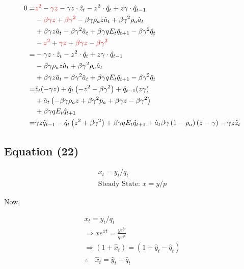 \documentclass[11pt,preprint, authoryear]{elsarticle}
\numberwithin{equation}{section}
\numberwithin{figure}{section}
\numberwithin{table}{section}
\begin{document}
\[\begin{aligned}
0 = & \begingroup\color{red}z^{2} \endgroup - \begingroup \color{red} {\gamma z} \endgroup - \gamma z \cdot \hat{z}_t - z^{2} \cdot \hat{q}_t 
+ z \gamma \cdot \hat{q}_{t-1}\\
& - \begingroup \color{red}{\beta \gamma z} \endgroup + \begingroup \color{red}{\beta \gamma^{2}} \endgroup - \beta \gamma \rho_{a} z \hat{a}_{t} + \beta \gamma^{2} \rho_{a} \hat{a}_{t}\\
& + \beta \gamma z \hat{a}_{t} - \beta \gamma^{2} \hat{a}_{t}
+\beta \gamma q E_{t} \hat{q}_{t+1}-\beta \gamma^{2} \hat{q}_{t} \\
& - \begingroup \color{red}{z^2} \endgroup + \begingroup \color{red}{\gamma z} \endgroup + \begingroup \color{red}{\beta \gamma z} \endgroup - \begingroup \color{red}{\beta \gamma^2} \endgroup \\
=& - \gamma z \cdot \hat{z}_t 
- z^{2} \cdot \hat{q}_t 
+ z \gamma \cdot \hat{q}_{t-1}\\
&-\beta \gamma \rho_{a} z \hat{a}_{t}+\beta \gamma^{2} \rho_{a} \hat{a}_{t}\\
&+\beta \gamma z \hat{a}_{t}-\beta \gamma^{2} \hat{a}_{t}
+\beta \gamma q E_{t} \hat{q}_{t+1}-\beta \gamma^{2} \hat{q}_{t} \\
= & \hat{z}_{t}(-\gamma z)+\hat{q}_{t}\left(-z^{2}-\beta \gamma^{2}\right)+\hat{q}_{t-1}(z \gamma) \\
&+\hat{a}_{t}\left(-\beta \gamma \rho_{a} z+\beta \gamma^{2} p_{a}+\beta \gamma z-\beta \gamma^{2}\right) \\
&+\beta \gamma q E_{t} \hat{q}_{t+1}\\
= & \gamma z \hat{q}_{t-1}-\hat{q}_{t}\left(z^{2}+\beta \gamma^{2}\right)+\beta \gamma q E_{t} \hat{q}_{t+1}+\hat{a}_{t} \beta \gamma\left(1-\rho_{a}\right)(z-\gamma)-\gamma z \hat{z}_{t}
\end{aligned}\]

\hypertarget{equation-22}{%
\subsection{Equation (22)}\label{equation-22}}

\[\begin{aligned} x_{t}=y_{t} / q_{t} \\
\text{Steady State: } x = y/p \end{aligned}\]

Now,

\[\begin{aligned} x_{t}=y_{t} / q_t\\
\Rightarrow x e^{\hat{x} t}=\frac{y e^{\hat{y} t}}{q e^{\hat{q} t}}\\
\Rightarrow\left(1+\hat{x}_{t}\right)=\left(1+\hat{y}_{t}-\hat{q}_{t}\right)\\
\therefore \quad \hat{x}_{t}=\hat{y}_{t}-\hat{q}_{t} \end{aligned}\]
\end{document}
